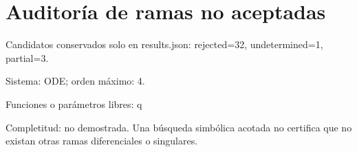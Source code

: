 \documentclass[10pt]{article}
\begin{document}
\section*{Auditoría de ramas no aceptadas}
Candidatos conservados solo en results.json: rejected=32, undetermined=1, partial=3.\par
Sistema: ODE; orden máximo: 4.\par
Funciones o parámetros libres: q\par
Completitud: no demostrada. Una búsqueda simbólica acotada no certifica que no existan otras ramas diferenciales o singulares.\par
\end{document}
